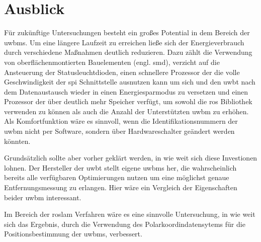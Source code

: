 %
%
\section{Ausblick}

Für zukünftige Untersuchungen besteht ein großes Potential in dem Bereich der \glspl{uwbm}. Um eine längere Laufzeit zu erreichen ließe sich der Energieverbrauch durch verschiedene Maßnahmen deutlich reduzieren. Dazu zählt die Verwendung von oberflächenmontierten Bauelementen (engl. \gls{smd}), verzicht auf die Ansteuerung der Statusleuchtdioden, einen schnellere Prozessor der die volle Geschwindigkeit der \gls{spi} Schnittstelle ausnutzen kann um sich und den \gls{uwbt} nach dem Datenaustausch wieder in einen Energiesparmodus zu versetzen und einen Prozessor der über deutlich mehr Speicher verfügt, um sowohl die \gls{ros} Bibliothek verwenden zu können als auch die Anzahl der Unterstützten \gls{uwbm} zu erhöhen. Als Komfortfunktion wäre es sinnvoll, wenn die Identifikationsnummern der \gls{uwbm} nicht per Software, sondern über Hardwareschalter geändert werden könnten.

Grundsätzlich sollte aber vorher geklärt werden, in wie weit sich diese Investionen lohnen. Der Hersteller der \gls{uwbt} stellt eigene \glspl{uwbm} her, die wahrscheinlich bereits alle verfügbaren Optimierungen nutzen um eine möglichst genaue Entfernungsmessung zu erlangen. Hier wäre ein Vergleich der Eigenschaften beider \gls{uwbm} interessant.

Im Bereich der \gls{roslam} Verfahren wäre es eine sinnvolle Untersuchung, in wie weit sich das Ergebnis, durch die Verwendung des Polarkoordindatensytems für die Positionsbestimmung der \glspl{uwbm}, verbessert.


